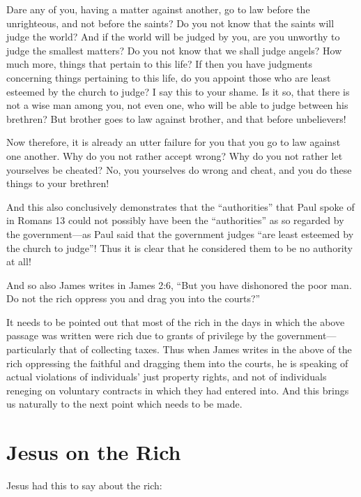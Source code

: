 \documentclass[letterpaper,12pt]{article}
\newenvironment{squotation}
  {\small\quotation}
  {\endquotation\normalsize}
\begin{document}
\begin{squotation}
Dare any of you, having a matter against another, go to law before the unrighteous, and not before the saints? Do you not know that the saints will judge the world? And if the world will be judged by you, are you unworthy to judge the smallest matters? Do you not know that we shall judge angels? How much more, things that pertain to this life? If then you have judgments concerning things pertaining to this life, do you appoint those who are least esteemed by the church to judge? I say this to your shame. Is it so, that there is not a wise man among you, not even one, who will be able to judge between his brethren? But brother goes to law against brother, and that before unbelievers!

Now therefore, it is already an utter failure for you that you go to law against one another. Why do you not rather accept wrong? Why do you not rather let yourselves be cheated? No, you yourselves do wrong and cheat, and you do these things to your brethren!
\end{squotation}

And this also conclusively demonstrates that the ``authorities'' that Paul spoke of in Romans 13 could not possibly have been the ``authorities'' as so regarded by the government---as Paul said that the government judges ``are least esteemed by the church to judge''! Thus it is clear that he considered them to be no authority at all!

And so also James writes in James 2:6, ``But you have dishonored the poor man. Do not the rich oppress you and drag you into the courts?''

It needs to be pointed out that most of the rich in the days in which the above passage was written were rich due to grants of privilege by the government---particularly that of collecting taxes. Thus when James writes in the above of the rich oppressing the faithful and dragging them into the courts, he is speaking of actual violations of individuals' just property rights, and not of individuals reneging on voluntary contracts in which they had entered into. And this brings us naturally to the next point which needs to be made.

\section{Jesus on the Rich}
\label{sec:JesusOnTheRich}

Jesus had this to say about the rich:
\end{document}
